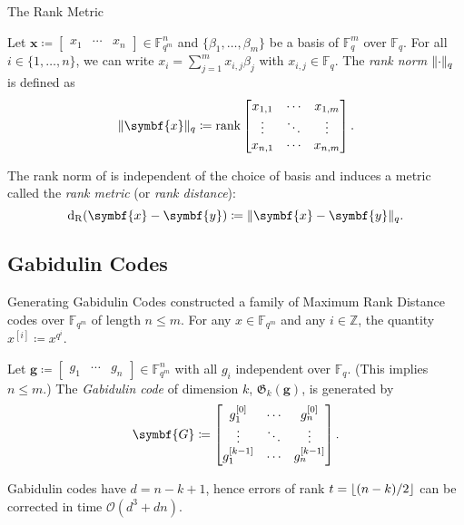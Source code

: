 \documentclass[usepdftitle=false]{beamer}
\renewcommand*{\vec}{\symbf}
\newcommand*{\mat}{\symbf}
\DeclareMathOperator{\rank}{rank}
\newcommand*{\FF}{\ensuremath{\mathbb{F}}}
\newcommand*{\ZZ}{\ensuremath{\mathbb{Z}}}
\newcommand*{\BigOh}{\mathcal{O}}
\newcommand*{\Gab}{\ensuremath{\mathfrak{G}}}
\DeclarePairedDelimiter{\floor}{\lfloor}{\rfloor}
\DeclarePairedDelimiter{\norm}{\lVert}{\rVert}
\newcommand*{\normR}[2]{\ensuremath{\norm{#1}_{#2}}}
\DeclareMathOperator{\dR}{d_R}
\begin{document}
\begin{frame}{The Rank Metric}
  \begin{definition}
    Let
    \(\vec{x} \coloneqq \begin{bmatrix} x_1 & \cdots &
      x_n \end{bmatrix} \in \FF_{q^m}^n\) and
    \(\{\beta_1, \ldots, \beta_m\}\) be a basis of \(\FF_q^m\) over
    \(\FF_q\).  For all \(i \in \{1, \ldots, n\}\), we can write
    \(x_i = \sum_{j = 1}^m x_{i, j} \beta_j\) with
    \(x_{i, j} \in \FF_q\).  The \emph{rank norm} \(\normR{\cdot}{q}\)
    is defined as
    \begin{equation}\label{eq:rank-norm}
      \normR{\vec{x}}{q} \coloneqq \rank \begin{bmatrix}
        x_{1, 1} & \cdots & x_{1, m} \\
        \vdots & \ddots & \vdots \\
        x_{n, 1} & \cdots & x_{n, m}
      \end{bmatrix}\text.
    \end{equation}
  \end{definition}
  The rank norm of is independent of the choice of basis and induces a
  metric called the \emph{rank metric} (or \emph{rank distance}):
  \[\dR(\vec{x} - \vec{y}) \coloneqq \normR{\vec{x} -
      \vec{y}}{q}\text.\]
\end{frame}

\subsection{Gabidulin Codes}

\begin{frame}{Generating Gabidulin Codes}
  \Textcite{Gab85} constructed a family of Maximum Rank Distance codes
  over \(\FF_{q^m}\) of length \(n \le m\).  For any
  \(x \in \FF_{q^m}\) and any \(i \in \ZZ\), the quantity
  \(x^{[i]} \coloneqq x^{q^i}\).
  \begin{definition}
    Let
    \(\vec{g} \coloneqq \begin{bmatrix} g_1 & \cdots &
      g_n \end{bmatrix} \in \FF_{q^m}^n\) with all \(g_i\) independent
    over \(\FF_q\).  (This implies \(n \le m\).)  The \emph{Gabidulin
      code} of dimension \(k\), \(\Gab_k(\vec{g})\), is generated by
    \begin{equation}\label{eq:gabidulin-code-generator}
      \mat{G} \coloneqq
      \begin{bmatrix}
        g_1^{[0]} & \cdots & g_n^{[0]} \\
        \vdots & \ddots & \vdots \\
        g_1^{[k - 1]} & \cdots & g_n^{[k - 1]}
      \end{bmatrix}\text.
    \end{equation}
  \end{definition}
  Gabidulin codes have \(d = n - k + 1\), hence errors of rank
  \(t = \floor{(n - k) / {2}}\) can be corrected in time
  \(\BigOh(d^3 + d n)\).
\end{frame}
\end{document}
